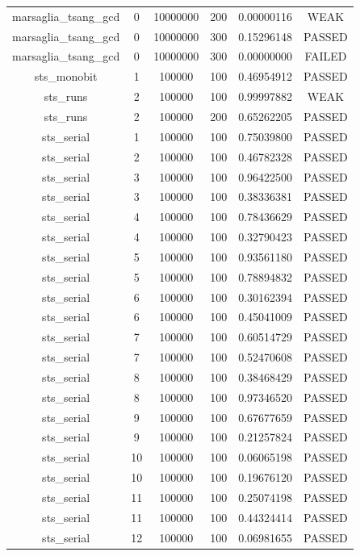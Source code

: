 \begin{longtable}{cccccc}
marsaglia\_tsang\_gcd & 0 & 10000000 & 200 & 0.00000116 & WEAK \\
marsaglia\_tsang\_gcd & 0 & 10000000 & 300 & 0.15296148 & PASSED \\
marsaglia\_tsang\_gcd & 0 & 10000000 & 300 & 0.00000000 & FAILED \\
sts\_monobit & 1 & 100000 & 100 & 0.46954912 & PASSED \\
sts\_runs & 2 & 100000 & 100 & 0.99997882 & WEAK \\
sts\_runs & 2 & 100000 & 200 & 0.65262205 & PASSED \\
sts\_serial & 1 & 100000 & 100 & 0.75039800 & PASSED \\
sts\_serial & 2 & 100000 & 100 & 0.46782328 & PASSED \\
sts\_serial & 3 & 100000 & 100 & 0.96422500 & PASSED \\
sts\_serial & 3 & 100000 & 100 & 0.38336381 & PASSED \\
sts\_serial & 4 & 100000 & 100 & 0.78436629 & PASSED \\
sts\_serial & 4 & 100000 & 100 & 0.32790423 & PASSED \\
sts\_serial & 5 & 100000 & 100 & 0.93561180 & PASSED \\
sts\_serial & 5 & 100000 & 100 & 0.78894832 & PASSED \\
sts\_serial & 6 & 100000 & 100 & 0.30162394 & PASSED \\
sts\_serial & 6 & 100000 & 100 & 0.45041009 & PASSED \\
sts\_serial & 7 & 100000 & 100 & 0.60514729 & PASSED \\
sts\_serial & 7 & 100000 & 100 & 0.52470608 & PASSED \\
sts\_serial & 8 & 100000 & 100 & 0.38468429 & PASSED \\
sts\_serial & 8 & 100000 & 100 & 0.97346520 & PASSED \\
sts\_serial & 9 & 100000 & 100 & 0.67677659 & PASSED \\
sts\_serial & 9 & 100000 & 100 & 0.21257824 & PASSED \\
sts\_serial & 10 & 100000 & 100 & 0.06065198 & PASSED \\
sts\_serial & 10 & 100000 & 100 & 0.19676120 & PASSED \\
sts\_serial & 11 & 100000 & 100 & 0.25074198 & PASSED \\
sts\_serial & 11 & 100000 & 100 & 0.44324414 & PASSED \\
sts\_serial & 12 & 100000 & 100 & 0.06981655 & PASSED \\

\end{longtable}
